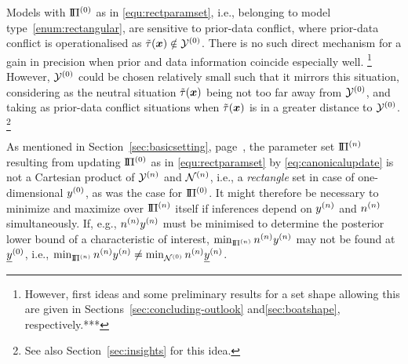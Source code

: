 
Models with $\text{I}\!\Pi^{(0)}$ as in \eqref{equ:rectparamset}, %
i.e., belonging to model type~\eqref{enum:rectangular},
are sensitive to prior-data conflict,
where prior-data conflict is operationalised as $\tilde{\tau}({\bm x}) \notin \mathcal{Y}^{(0)}$.
There is no such direct mechanism for a gain in precision when prior and data information coincide especially well.%
\footnote{However, first ideas and some preliminary results for a set shape allowing this
are given in Sections~\ref{sec:concluding-outlook} and\ref{sec:boatshape}, respectively.***}
However, $\mathcal{Y}^{(0)}$ could be chosen relatively small such that it mirrors this situation,
considering as the neutral situation $\tilde{\tau}({\bm x})$ being not too far away from $\mathcal{Y}^{(0)}$,
and taking as prior-data conflict situations when $\tilde{\tau}({\bm x})$ is in a greater distance to $\mathcal{Y}^{(0)}$.%
\footnote{See also Section~\ref{sec:insights} for this idea.}

As mentioned in Section~\ref{sec:basicsetting}, page~\pageref{enum:rectangular},
the parameter set $\text{I}\!\Pi^{(n)}$ resulting from updating $\text{I}\!\Pi^{(0)}$ as in \eqref{equ:rectparamset}
by \eqref{eq:canonicalupdate} is not a Cartesian product of $\mathcal{Y}^{(n)}$ and $\mathcal{N}^{(n)}$,
i.e., a \emph{rectangle} set in case of one-dimensional $y^{(0)}$, as was the case for $\text{I}\!\Pi^{(0)}$.
It might therefore be necessary to minimize and maximize over $\text{I}\!\Pi^{(n)}$ itself if inferences depend on $y^{(n)}$ and $n^{(n)}$ simultaneously.
If, e.g., $n^{(n)}y^{(n)}$ must be minimised to determine the posterior lower bound of a characteristic of interest,
$\min_{\text{I}\!\Pi^{(n)}} n^{(n)}y^{(n)}$ may not be found at $\underline{y}^{(0)}$, i.e., $\min_{\text{I}\!\Pi^{(n)}} n^{(n)}y^{(n)} \not = \min_{\mathcal{N}^{(0)}} n^{(n)}\underline{y}^{(n)}$.


